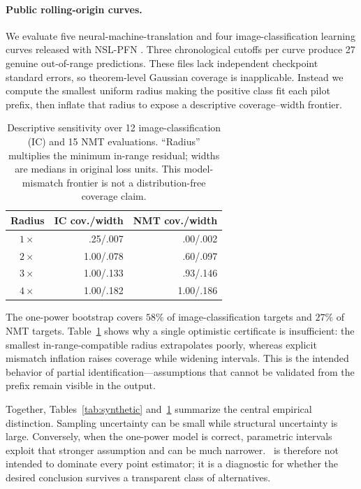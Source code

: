 \paragraph{Public rolling-origin curves.}
We evaluate five neural-machine-translation and four image-classification learning curves released with NSL-PFN \citep{lee2025bayesian}. Three chronological cutoffs per curve produce 27 genuine out-of-range predictions. These files lack independent checkpoint standard errors, so theorem-level Gaussian coverage is inapplicable. Instead we compute the smallest uniform radius making the positive class fit each pilot prefix, then inflate that radius to expose a descriptive coverage--width frontier.

\begin{table}[t]
\centering
\small
\begin{tabular}{@{}crr@{}}
\toprule
Radius & IC cov./width & NMT cov./width \\
\midrule
$1\times$ & .25/.007 & .00/.002 \\
$2\times$ & 1.00/.078 & .60/.097 \\
$3\times$ & 1.00/.133 & .93/.146 \\
$4\times$ & 1.00/.182 & 1.00/.186 \\
\bottomrule
\end{tabular}
\caption{Descriptive sensitivity over 12 image-classification (IC) and 15 NMT evaluations. ``Radius'' multiplies the minimum in-range residual; widths are medians in original loss units. This model-mismatch frontier is not a distribution-free coverage claim.}
\label{tab:public}
\end{table}

The one-power bootstrap covers $58\%$ of image-classification targets and $27\%$ of NMT targets. Table~\ref{tab:public} shows why a single optimistic certificate is insufficient: the smallest in-range-compatible radius extrapolates poorly, whereas explicit mismatch inflation raises coverage while widening intervals. This is the intended behavior of partial identification---assumptions that cannot be validated from the prefix remain visible in the output.



Together, Tables~\ref{tab:synthetic} and~\ref{tab:public} summarize the central empirical distinction. Sampling uncertainty can be small while structural uncertainty is large. Conversely, when the one-power model is correct, parametric intervals exploit that stronger assumption and can be much narrower. \ScaleCert\ is therefore not intended to dominate every point estimator; it is a diagnostic for whether the desired conclusion survives a transparent class of alternatives.
